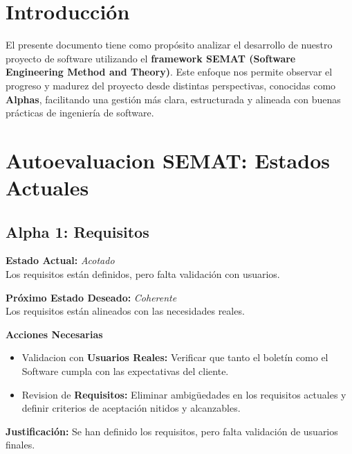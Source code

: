 \documentclass[12pt]{article}
\begin{document}
\vspace{1cm}

\section{Introducción}

El presente documento tiene como propósito analizar
el desarrollo de nuestro proyecto de software utilizando
el \textbf{framework SEMAT (Software Engineering Method
    and Theory)}. Este enfoque nos permite observar el
progreso y madurez del proyecto desde distintas
perspectivas, conocidas como \textbf{Alphas}, facilitando una
gestión más clara, estructurada y alineada con buenas
prácticas de ingeniería de software.


\section{Autoevaluacion SEMAT: Estados Actuales}


\subsection{Alpha 1: Requisitos}


\textbf{Estado Actual:} \textit{Acotado} \\
\hspace*{1cm} Los requisitos están definidos, pero falta validación con usuarios.

\textbf{Próximo Estado Deseado:} \textit{Coherente} \\
\hspace*{1cm} Los requisitos están alineados con las necesidades reales.


\vspace{0.1cm}

\textbf{Acciones Necesarias}
\begin{itemize}
    \item Validacion con \textbf{Usuarios Reales:} Verificar que tanto
          el boletín como el Software cumpla con las expectativas del cliente.
    \item Revision de \textbf{Requisitos:} Eliminar ambigüedades en los
          requisitos actuales y definir criterios de aceptación nitidos y alcanzables.
\end{itemize}

\vspace{0.1cm}

\textbf{Justificación:} Se han definido los requisitos, pero falta validación de usuarios finales.
\end{document}

